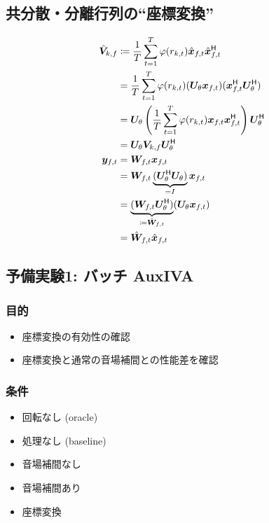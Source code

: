 \documentclass[twocolumn,9pt,dvipdfmx]{article}
\begin{document}
\subsection*{共分散・分離行列の``座標変換''}
\begin{align}
  \rot{\cov} _{\src,\freq} &\coloneqq \frac{1}{\Tframe} \sum _{\tframe = 1} ^{\Tframe} \weight (\var _{\src,\tframe}) \rotObs _{\ft} \rotObs _{\ft} ^{\hermite} \\
                           &= \frac{1}{\Tframe} \sum _{\tframe = 1} ^{\Tframe} \weight (\var _{\src,\tframe}) (\rotMat _{\rotDeg} \Obs _{\ft}) (\Obs _{\ft} ^{\hermite} \rotMat _{\rotDeg} ^{\hermite}) \\
                           &= \rotMat _{\rotDeg} \left(\frac{1}{\Tframe} \sum _{\tframe = 1} ^{\Tframe} \weight (\var _{\src,\tframe}) \Obs _{\ft} \Obs _{\ft} ^{\hermite}\right) \rotMat _{\rotDeg} ^{\hermite} \\
                           &= \rotMat _{\rotDeg} \cov _{\src,\freq} \rotMat _{\rotDeg} ^{\hermite}
  \\
  \Est _{\ft} &= \Demix _{\ft} \Obs _{\ft} \\
              &= \Demix _{\ft} \underbrace{(\rotMat _{\rotDeg} ^{\hermite} \rotMat _{\rotDeg})}_{=I} \Obs _{\ft} \\
              &= \underbrace{(\Demix _{\ft} \rotMat _{\rotDeg} ^{\hermite})}_{\coloneqq \rotDemix _{\ft}} (\rotMat _{\rotDeg} \Obs _{\ft}) \\
              &= \rotDemix _{\ft} \rotObs _{\ft}
\end{align}

\subsection*{予備実験1: バッチ AuxIVA}
\subsubsection*{目的}
\begin{itemize}
  \item 座標変換の有効性の確認
  \item 座標変換と通常の音場補間との性能差を確認
\end{itemize}

\subsubsection*{条件}
\begin{itemize}
  \item 回転なし (oracle)
  \item 処理なし (baseline)
  \item 音場補間なし
  \item 音場補間あり
  \item 座標変換
\end{itemize}
\end{document}
